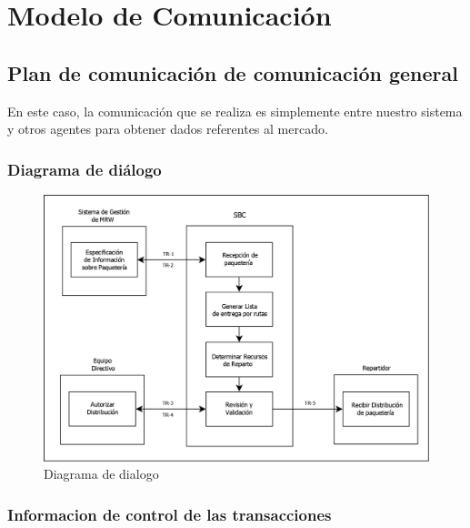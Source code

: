 

\chapter{Modelo de Comunicación}

\section{Plan de comunicación de comunicación general}
En este caso, la comunicación que se realiza es simplemente entre nuestro sistema y otros agentes para obtener dados referentes al mercado.

\subsection{Diagrama de diálogo}

  \begin{figure}[H]
    \centering
    \includegraphics[scale=0.23]{imaxes/Comunicaciones.png}
    \caption{\label{fig:Comunicaciones}Diagrama de dialogo}
  \end{figure}
  
\subsection{Informacion de control de las transacciones}

